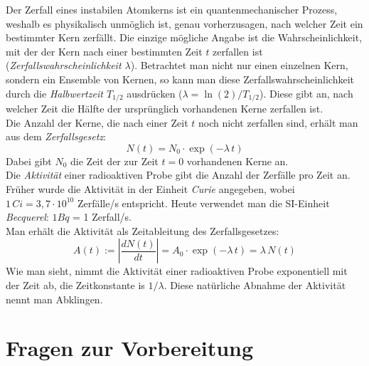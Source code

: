 Der Zerfall eines instabilen Atomkerns ist ein quantenmechanischer Prozess, weshalb es physikalisch unmöglich ist, genau vorherzusagen, nach welcher Zeit ein bestimmter Kern zerfällt. Die einzige mögliche Angabe ist die Wahrscheinlichkeit, mit der der Kern nach einer bestimmten Zeit $t$ zerfallen ist (\textit{Zerfallswahrscheinlichkeit $\lambda$}). Betrachtet man nicht nur einen einzelnen Kern, sondern ein Ensemble von Kernen, so kann man diese Zerfallswahrscheinlichkeit durch die \textit{Halbwertzeit $T_{1/2}$} ausdrücken ($\lambda = \ln(2)/T_{1/2}$). Diese gibt an, nach welcher Zeit die Hälfte der ursprünglich vorhandenen Kerne zerfallen ist.\\
Die Anzahl der Kerne, die nach einer Zeit $t$ noch nicht zerfallen sind, erhält man aus dem \textit{Zerfallsgesetz}:
\begin{equation} \label{eq:Zerfallsgesetz}
	N(t) = N_0\cdot \exp(-\lambda\, t)
\end{equation}
Dabei gibt $N_0$ die Zeit der zur Zeit $t=0$ vorhandenen Kerne an.\\

\noindent
Die \textit{Aktivität} einer radioaktiven Probe gibt die Anzahl der Zerfälle pro Zeit an. Früher wurde die Aktivität in der Einheit \textit{Curie} angegeben, wobei $1\,Ci = 3,7\cdot 10^{10}$ Zerfälle/s entspricht. Heute verwendet man die SI-Einheit \textit{Becquerel}: $1 Bq$ = 1 Zerfall/s.\\
Man erhält die Aktivität als Zeitableitung des Zerfallsgesetzes:
\begin{equation} \label{eq:Aktivitaet}
	A(t) := \left|\frac{dN(t)}{dt}\right| = A_0\cdot\exp(-\lambda\, t) = \lambda\, N(t)
\end{equation}
Wie man sieht, nimmt die Aktivität einer radioaktiven Probe exponentiell mit der Zeit ab, die Zeitkonstante is $1/\lambda$. Diese natürliche Abnahme der Aktivität nennt man Abklingen.


\section{Fragen zur Vorbereitung}

